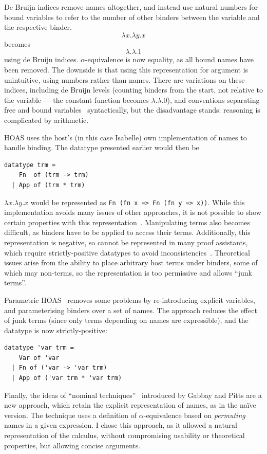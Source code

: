 De Bruijn indices remove names altogether, and instead use natural numbers for bound variables to refer to the number of other binders between the variable and the respective binder.
\[
\lambda x. \lambda y. x
\]
becomes
\[
\lambda.\lambda. 1
\]
using de Bruijn indices.
\(\alpha\)-equivalence is now equality, as all bound names have been removed.
The downside is that using this representation for argument is unintuitive, using numbers rather than names.
There are variations on these indices, including de Bruijn levels (counting binders from the start, not relative to the variable --- the constant function becomes \(\lambda.\lambda. 0\)), and conventions separating free and bound variables~\cite{i-am-a-free-variable} syntactically, but the disadvantage stands: reasoning is complicated by arithmetic.

HOAS uses the host's (in this case Isabelle) own implementation of names to handle binding.
The datatype presented earlier would then be

\begin{verbatim}
datatype trm =
    Fn  of (trm -> trm)
  | App of (trm * trm)
\end{verbatim}

\(\lambda x.\lambda y.x\) would be represented as \texttt{Fn (fn x => Fn (fn y => x))}.
While this implementation avoids many issues of other approaches, it is not possible to show certain properties with this representation~\cite{HOAS}.
Manipulating terms also becomes difficult, as binders have to be applied to access their terms.
Additionally, this representation is negative, so cannot be represented in many proof assistants, which require strictly-positive datatypes to avoid inconsistencies~\cite{inductive-types}.
Theoretical issues arise from the ability to place arbitrary host terms under binders, some of which may non-terms, so the representation is too permissive and allows ``junk terms''.

Parametric HOAS~\cite{PHOAS} removes some problems by re-introducing explicit variables, and parameterising binders over a set of names.
The approach reduces the effect of junk terms (since only terms depending on names are expressible), and the datatype is now strictly-positive:

\begin{verbatim}
datatype 'var trm =
    Var of 'var
  | Fn of ('var -> 'var trm)
  | App of ('var trm * 'var trm)
\end{verbatim}

Finally, the ideas of ``nominal techniques''~\cite{nominal} introduced by Gabbay and Pitts are a new approach, which retain the explicit representation of names, as in the na\"ive version.
The technique uses a definition of \(\alpha\)-equivalence based on \emph{permuting} names in a given expression.
I chose this approach, as it allowed a natural representation of the calculus, without compromising usability or theoretical properties, but allowing concise arguments.

